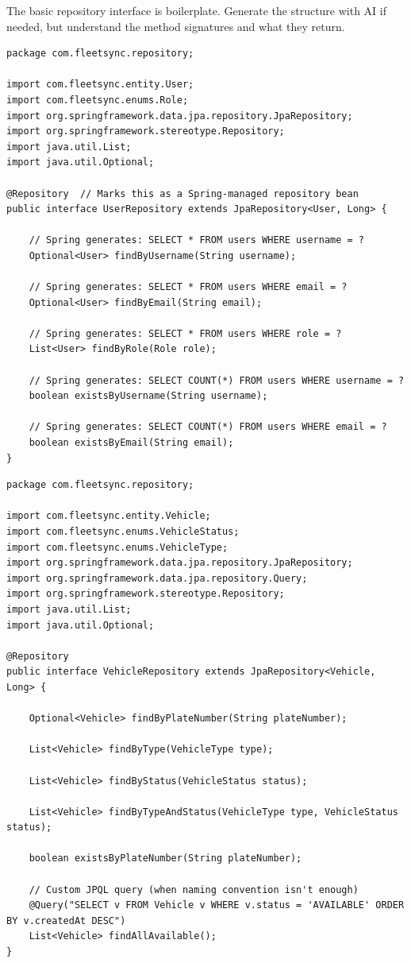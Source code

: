 \documentclass[12pt,a4paper]{report}
\begin{document}
\begin{tcolorbox}[aibox]
The basic repository interface is boilerplate. Generate the structure with AI if needed, but understand the method signatures and what they return.
\end{tcolorbox}

\begin{lstlisting}[caption=UserRepository.java]
package com.fleetsync.repository;

import com.fleetsync.entity.User;
import com.fleetsync.enums.Role;
import org.springframework.data.jpa.repository.JpaRepository;
import org.springframework.stereotype.Repository;
import java.util.List;
import java.util.Optional;

@Repository  // Marks this as a Spring-managed repository bean
public interface UserRepository extends JpaRepository<User, Long> {

    // Spring generates: SELECT * FROM users WHERE username = ?
    Optional<User> findByUsername(String username);

    // Spring generates: SELECT * FROM users WHERE email = ?
    Optional<User> findByEmail(String email);

    // Spring generates: SELECT * FROM users WHERE role = ?
    List<User> findByRole(Role role);

    // Spring generates: SELECT COUNT(*) FROM users WHERE username = ?
    boolean existsByUsername(String username);

    // Spring generates: SELECT COUNT(*) FROM users WHERE email = ?
    boolean existsByEmail(String email);
}
\end{lstlisting}

\begin{lstlisting}[caption=VehicleRepository.java]
package com.fleetsync.repository;

import com.fleetsync.entity.Vehicle;
import com.fleetsync.enums.VehicleStatus;
import com.fleetsync.enums.VehicleType;
import org.springframework.data.jpa.repository.JpaRepository;
import org.springframework.data.jpa.repository.Query;
import org.springframework.stereotype.Repository;
import java.util.List;
import java.util.Optional;

@Repository
public interface VehicleRepository extends JpaRepository<Vehicle, Long> {

    Optional<Vehicle> findByPlateNumber(String plateNumber);

    List<Vehicle> findByType(VehicleType type);

    List<Vehicle> findByStatus(VehicleStatus status);

    List<Vehicle> findByTypeAndStatus(VehicleType type, VehicleStatus status);

    boolean existsByPlateNumber(String plateNumber);

    // Custom JPQL query (when naming convention isn't enough)
    @Query("SELECT v FROM Vehicle v WHERE v.status = 'AVAILABLE' ORDER BY v.createdAt DESC")
    List<Vehicle> findAllAvailable();
}
\end{lstlisting}
\end{document}

